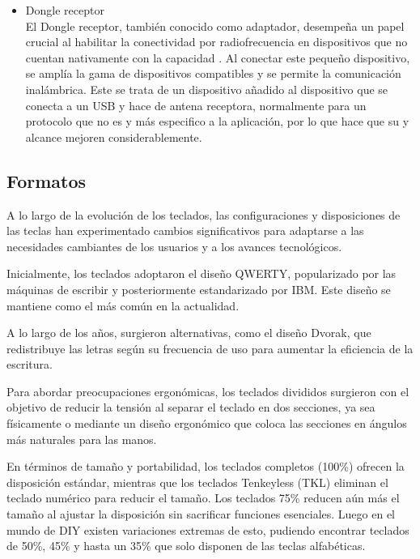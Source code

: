 \begin{itemize}
\begin{itemize}
        \item \gls{Dongle} receptor \\
            El \gls{Dongle} receptor, también conocido como adaptador, desempeña un papel crucial al habilitar la conectividad por radiofrecuencia en dispositivos que no cuentan nativamente con la capacidad . Al conectar este pequeño dispositivo, se amplía la gama de dispositivos compatibles y se permite la comunicación inalámbrica. Este se trata de un dispositivo añadido al dispositivo que se conecta a un \gls{USB} y hace de antena receptora, normalmente para un protocolo que no es  y más especifico a la aplicación, por lo que hace que su  y alcance mejoren considerablemente.
    \end{itemize}
\end{itemize}

\subsection{Formatos}

A lo largo de la evolución de los teclados, las configuraciones y disposiciones de las teclas han experimentado cambios significativos para adaptarse a las necesidades cambiantes de los usuarios y a los avances tecnológicos.

Inicialmente, los teclados adoptaron el diseño \gls{QWERTY}, popularizado por las máquinas de escribir y posteriormente estandarizado por IBM. Este diseño se mantiene como el más común en la actualidad.

A lo largo de los años, surgieron alternativas, como el diseño Dvorak, que redistribuye las letras según su frecuencia de uso para aumentar la eficiencia de la escritura.

Para abordar preocupaciones ergonómicas, los teclados divididos surgieron con el objetivo de reducir la tensión al separar el teclado en dos secciones, ya sea físicamente o mediante un diseño ergonómico que coloca las secciones en ángulos más naturales para las manos.

En términos de tamaño y portabilidad, los teclados completos (100\%) ofrecen la disposición estándar, mientras que los teclados Tenkeyless (TKL) eliminan el teclado numérico para reducir el tamaño. Los teclados 75\% reducen aún más el tamaño al ajustar la disposición sin sacrificar funciones esenciales. Luego en el mundo de \gls{DIY} existen variaciones extremas de esto, pudiendo encontrar teclados de 50\%, 45\% y hasta un 35\% que solo disponen de las teclas alfabéticas.

